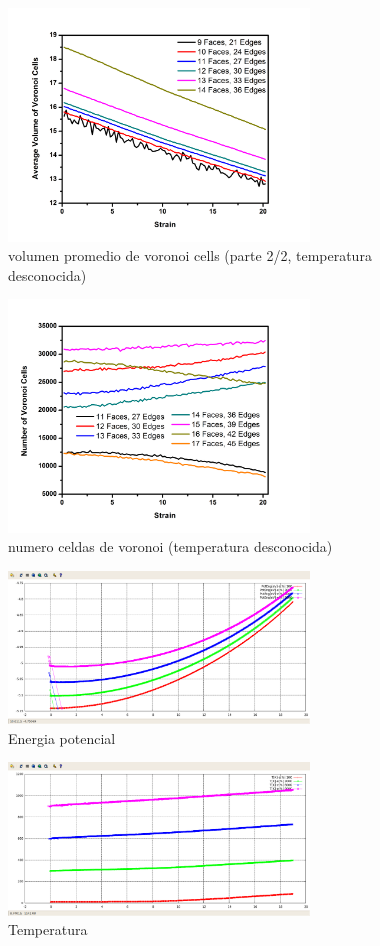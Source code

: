 \documentclass[10pt, oneside]{article} %
\begin{document}
\begin{figure}[H]
\centering
\includegraphics[width=8cm]{Figures/COMP_Vol_Step_B.png}
\caption{volumen promedio de voronoi cells (parte 2/2, temperatura desconocida)}
\end{figure}

\begin{figure}[H]
\centering
\includegraphics[width=8cm]{Figures/COMP_Num_Step.png}
\caption{numero celdas de voronoi (temperatura desconocida)}
\end{figure}

\begin{figure}[H]
\centering
\includegraphics[width=8cm]{Figures/EngPot_COMP.png}
\caption{Energia potencial}
\end{figure}

\begin{figure}[H]
\centering
\includegraphics[width=8cm]{Figures/Temp_COMP.png}
\caption{Temperatura}
\end{figure}
\end{document}
